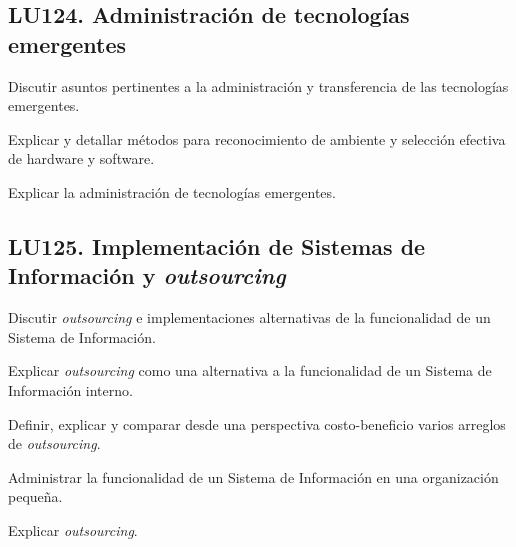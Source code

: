 \subsection{LU124. Administración de tecnologías emergentes}\label{sec:BOK-LU124}\label{sec:LU124}
\begin{LearningUnit}
\begin{LUGoal}
\item Discutir asuntos pertinentes a la administración y transferencia de las tecnologías emergentes.
\end{LUGoal}

\begin{LUObjective}
\item Explicar y detallar métodos para reconocimiento de ambiente y selección efectiva de hardware y software.
\item Explicar la administración de tecnologías emergentes.
\end{LUObjective}
\end{LearningUnit}

\subsection{LU125. Implementación de Sistemas de Información y \textit{outsourcing}}\label{sec:BOK-LU125}\label{sec:LU125}
\begin{LearningUnit}
\begin{LUGoal}
\item Discutir \textit{outsourcing} e implementaciones alternativas de la funcionalidad de un Sistema de Información.
\end{LUGoal}

\begin{LUObjective}
\item Explicar \textit{outsourcing} como una alternativa a la funcionalidad de un Sistema de Información interno.
\item Definir, explicar y comparar desde una perspectiva costo-beneficio varios arreglos de \textit{outsourcing}.
\item Administrar la funcionalidad de un Sistema de Información en una organización pequeña.
\item Explicar \textit{outsourcing}.
\end{LUObjective}
\end{LearningUnit}

